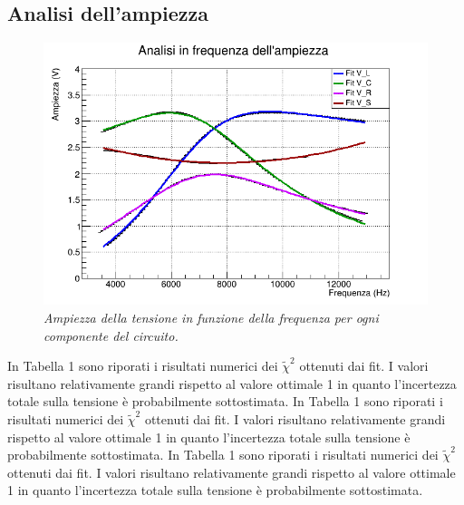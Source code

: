 \documentclass{article}
\begin{document}
\subsection{Analisi dell'ampiezza}
\begin{figure}[h]
  \centering
  \includegraphics[scale=0.45]{AmpFreq.png}
  \caption{\textit{Ampiezza della tensione in funzione della frequenza per ogni componente del circuito.}}

\end{figure}
In Tabella 1 sono riporati i risultati numerici dei $\tilde{\chi}^2$ ottenuti dai fit. I valori risultano relativamente grandi rispetto al valore ottimale 1 in quanto l'incertezza totale sulla tensione è probabilmente sottostimata.
In Tabella 1 sono riporati i risultati numerici dei $\tilde{\chi}^2$ ottenuti dai fit. I valori risultano relativamente grandi rispetto al valore ottimale 1 in quanto l'incertezza totale sulla tensione è probabilmente sottostimata.
In Tabella 1 sono riporati i risultati numerici dei $\tilde{\chi}^2$ ottenuti dai fit. I valori risultano relativamente grandi rispetto al valore ottimale 1 in quanto l'incertezza totale sulla tensione è probabilmente sottostimata.
\end{document}
